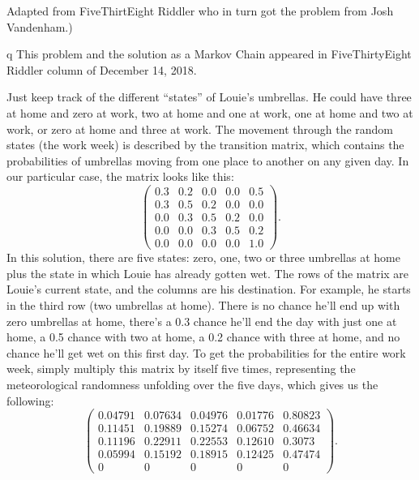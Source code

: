 \documentclass[12pt]{article}
\begin{document}
\begin{solution}
    Adapted from 
    {FiveThirtEight Riddler} who in turn got the problem from Josh
    Vandenham.)
    \begin{remark}
        q This problem and the solution as a Markov Chain appeared in
        {FiveThirtyEight Riddler column of December 14, 2018.}
    \end{remark}

    Just keep track of the different ``states'' of Louie’s umbrellas.
    He could have three at home and zero at work, two at home and one at
    work, one at home and two at work, or zero at home and three at
    work.  The movement through the random states (the work week) is
    described by the transition matrix, which contains the probabilities
    of umbrellas moving from one place to another on any given day.  In
    our particular case, the matrix looks like this:
    \[
        \begin{pmatrix}
            0.3 & 0.2 & 0.0 & 0.0 & 0.5\\
            0.3 & 0.5 & 0.2 & 0.0 & 0.0\\
            0.0 & 0.3 & 0.5 & 0.2 & 0.0\\
            0.0 & 0.0 & 0.3 & 0.5 & 0.2\\
            0.0 & 0.0 & 0.0 & 0.0 & 1.0
        \end{pmatrix}
        .
    \] In this solution, there are five states:  zero, one, two or three
    umbrellas at home plus the state in which Louie has already gotten
    wet.  The rows of the matrix are Louie’s current state, and the
    columns are his destination.  For example, he starts in the third
    row (two umbrellas at home).  There is no chance he’ll end up with
    zero umbrellas at home, there’s a 0.3 chance he’ll end the day
    with just one at home, a 0.5 chance with two at home, a 0.2 chance
    with three at home, and no chance he’ll get wet on this first day.
    To get the probabilities for the entire work week, simply multiply
    this matrix by itself five times, representing the meteorological
    randomness unfolding over the five days, which gives us the
    following:
    \[
        \begin{pmatrix}
            \nonumber 0.04791 &0.07634 &0.04976 &0.01776 &0.80823\\
            0.11451 &0.19889 &0.15274 &0.06752 &0.46634\\
            0.11196 &0.22911 &0.22553 &0.12610 &0.3073\\
            0.05994 &0.15192 &0.18915 &0.12425 &0.47474\\
            0 &0 &0 &0 &0
        \end{pmatrix}
        .
    \]


\end{solution}
\end{document}

